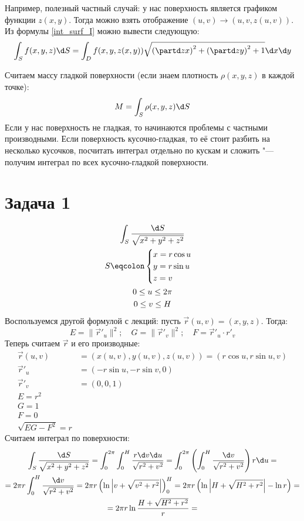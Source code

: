 Например, полезный частный случай: у нас поверхность является графиком функции $z(x, y)$.
Тогда можно взять отображение $(u, v) \to (u, v, z(u, v))$.
Из формулы \ref{int_surf_I} можно вывести следующую:
\begin{equation}\label{int_surf_I_graph}
	\int_{S} f(x, y, z) \d S = \int_D f(x, y, z(x, y)) \sqrt{\left(\partd z x\right)^2+\left(\partd z y\right)^2+1}\d x \d y
\end{equation}

Считаем массу гладкой поверхности (если знаем плотность $\rho(x, y, z)$ в каждой точке):
\[ M = \int_S \rho(x, y, z) \d S \]
Если у нас поверхность не гладкая, то начинаются проблемы с частными производными.
Если поверхность кусочно-гладкая, то её стоит разбить на несколько кусочков, посчитать интеграл отдельно
по кускам и сложить "--- получим интеграл по всех кусочно-гладкой поверхности.

\section{Задача 1}
\begin{gather*}
	\int_S \frac{\d S}{\sqrt{x^2+y^2+z^2}} \\
	S \eqcolon
		\begin{cases}
			x = r \cos u \\
			y = r \sin u \\
			z = v
		\end{cases} \\
	0 \le u \le 2 \pi \\
	0 \le v \le H
\end{gather*}
Воспользуемся другой формулой с лекций: пусть $\vec r(u, v) = (x, y, z)$. Тогда:
\begin{equation}\label{int_surf_I_dot}
	E = \|\vec r'_u\|^2;
	\quad
	G = \|\vec r'_v\|^2;
	\quad
	F = \vec r'_u \cdot r'_v
\end{equation}
Теперь считаем $\vec r$ и его производные:
\begin{align*}
	\vec r(u, v) &= (x(u, v), y(u, v), z(u, v)) = (r \cos u, r \sin u, v) \\
	\vec r'_u &= (-r \sin u, -r \sin v, 0) \\
	\vec r'_v &= (0, 0, 1) \\
	E = r^2 \\
	G = 1 \\
	F = 0 \\
	\sqrt{EG-F^2}=r
\end{align*}
Считаем интеграл по поверхности:
\begin{gather*}
	\int_S \frac{\d S}{\sqrt{x^2+y^2+z^2}} =
	\int_0^{2\pi} \int_0^H \frac{r \d v \d u}{\sqrt{r^2+v^2}} =
	\int_0^{2\pi} \left(\int_0^H \frac{\d v}{\sqrt{r^2+v^2}}\right)r \d u = \\
	= 2 \pi r \int_0^H \frac{\d v}{\sqrt{r^2+v^2}} =
	2 \pi r \left( \ln \left| v + \sqrt{v^2 + r^2} \right| \right)_0^H =
	2 \pi r \left( \ln \left| H + \sqrt{H^2 + r^2} \right| - \ln r \right) = \\
	= 2 \pi r \ln \frac{H + \sqrt{H^2 + r^2}}{r} =
\end{gather*}

